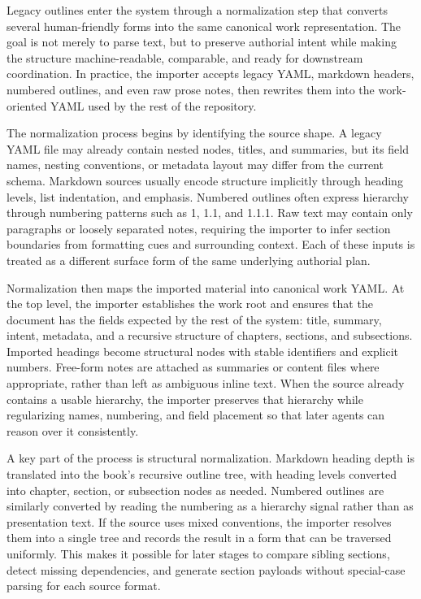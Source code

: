 Legacy outlines enter the system through a normalization step that converts several human-friendly forms into the same canonical work representation. The goal is not merely to parse text, but to preserve authorial intent while making the structure machine-readable, comparable, and ready for downstream coordination. In practice, the importer accepts legacy YAML, markdown headers, numbered outlines, and even raw prose notes, then rewrites them into the work-oriented YAML used by the rest of the repository.

The normalization process begins by identifying the source shape. A legacy YAML file may already contain nested nodes, titles, and summaries, but its field names, nesting conventions, or metadata layout may differ from the current schema. Markdown sources usually encode structure implicitly through heading levels, list indentation, and emphasis. Numbered outlines often express hierarchy through numbering patterns such as 1, 1.1, and 1.1.1. Raw text may contain only paragraphs or loosely separated notes, requiring the importer to infer section boundaries from formatting cues and surrounding context. Each of these inputs is treated as a different surface form of the same underlying authorial plan.

Normalization then maps the imported material into canonical work YAML. At the top level, the importer establishes the work root and ensures that the document has the fields expected by the rest of the system: title, summary, intent, metadata, and a recursive structure of chapters, sections, and subsections. Imported headings become structural nodes with stable identifiers and explicit numbers. Free-form notes are attached as summaries or content files where appropriate, rather than left as ambiguous inline text. When the source already contains a usable hierarchy, the importer preserves that hierarchy while regularizing names, numbering, and field placement so that later agents can reason over it consistently.

A key part of the process is structural normalization. Markdown heading depth is translated into the book's recursive outline tree, with heading levels converted into chapter, section, or subsection nodes as needed. Numbered outlines are similarly converted by reading the numbering as a hierarchy signal rather than as presentation text. If the source uses mixed conventions, the importer resolves them into a single tree and records the result in a form that can be traversed uniformly. This makes it possible for later stages to compare sibling sections, detect missing dependencies, and generate section payloads without special-case parsing for each source format.

